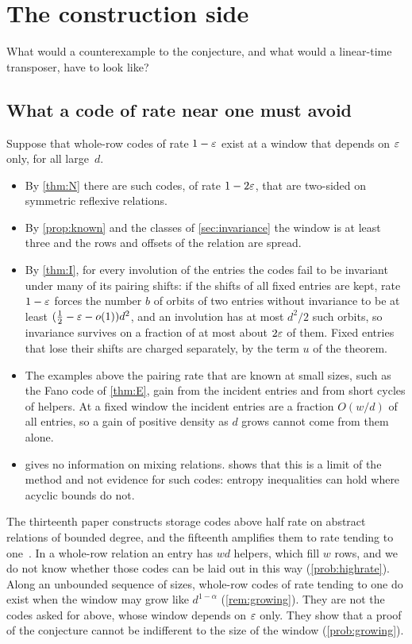 \section{The construction side}\label{sec:construction}

What would a counterexample to the conjecture, and what would a linear-time transposer, have to look like?

\subsection{What a code of rate near one must avoid}\label{sec:constr-code}

Suppose that whole-row codes of rate $1-\varepsilon$ exist at a window that depends on $\varepsilon$ only, for all large~$d$.
\begin{itemize}[leftmargin=1.5em]
\item By \cref{thm:N} there are such codes, of rate $1-2\varepsilon$, that are two-sided on symmetric reflexive relations.
\item By \cref{prop:known} and the classes of \cref{sec:invariance} the window is at least three and the rows and
offsets of the relation are spread.
\item By \cref{thm:I}, for every involution of the entries the codes fail to be invariant under many of its pairing
shifts: if the shifts of all fixed entries are kept, rate $1-\varepsilon$ forces the number $b$ of orbits of two entries
without invariance to be at least $(\tfrac12-\varepsilon-o(1))d^2$, and an involution has at most $d^2/2$ such orbits, so
invariance survives on a fraction of at most about $2\varepsilon$ of them. Fixed entries that lose their shifts are charged
separately, by the term $u$ of the theorem.
\item The examples above the pairing rate that are known at small sizes, such as the Fano code of \cref{thm:E}, gain
from the incident entries and from short cycles of helpers. At a fixed window the incident entries are a fraction
$O(w/d)$ of all entries, so a gain of positive density as $d$ grows cannot come from them alone.
\item {} gives no information on mixing relations.  shows that this is a limit of the method
and not evidence for such codes: entropy inequalities can hold where acyclic bounds do not.
\end{itemize}
The thirteenth paper constructs storage codes above half rate on abstract relations of bounded degree, and the
fifteenth amplifies them to rate tending to one~\cite{StorageCodes2026,HighRate2026}. In a whole-row relation an entry has $wd$ helpers, which fill $w$ rows,
and we do not know whether those codes can be laid out in this way (\cref{prob:highrate}).
Along an unbounded sequence of sizes, whole-row codes of rate tending to one do exist when the window may grow like
$d^{1-\alpha}$ (\cref{rem:growing}).
They are not the codes asked for above, whose window depends on $\varepsilon$ only. They show that a proof of the conjecture
cannot be indifferent to the size of the window (\cref{prob:growing}).

